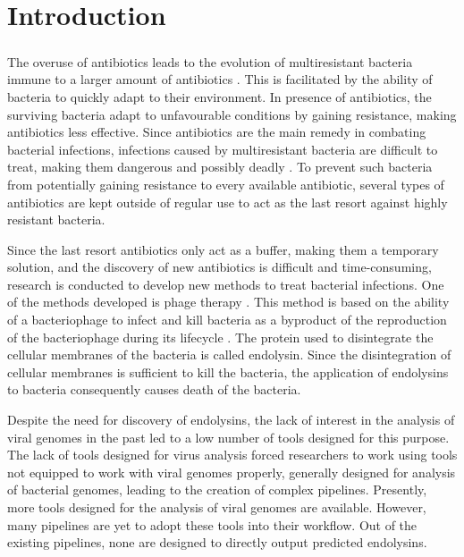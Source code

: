 \chapter*{Introduction} %

\paragraph*{}
The overuse of antibiotics leads to the evolution of multiresistant bacteria immune to a larger amount of antibiotics \cite{nikaido2009multidrug}. This is facilitated by the ability of bacteria to quickly adapt to their environment. In presence of antibiotics, the surviving bacteria adapt to unfavourable conditions by gaining resistance, making antibiotics less effective. Since antibiotics are the main remedy in combating bacterial infections, infections caused by multiresistant bacteria are difficult to treat, making them dangerous and possibly deadly \cite{mckenna2013last}. To prevent such bacteria from potentially gaining resistance to every available antibiotic, several types of antibiotics are kept outside of regular use to act as the last resort against highly resistant bacteria.

Since the last resort antibiotics only act as a buffer, making them a temporary solution, and the discovery of new antibiotics is difficult and time-consuming, research is conducted to develop new methods to treat bacterial infections. One of the methods developed is phage therapy \cite{vandenheuvel2015bacteriophage}. This method is based on the ability of a bacteriophage to infect and kill bacteria as a byproduct of the reproduction of the bacteriophage during its lifecycle \cite{gordillo2019phage}. The protein used to disintegrate the cellular membranes of the bacteria is called endolysin. Since the disintegration of cellular membranes is sufficient to kill the bacteria, the application of endolysins to bacteria consequently causes death of the bacteria. 

Despite the need for discovery of endolysins, the lack of interest in the analysis of viral genomes in the past led to a low number of tools designed for this purpose. The lack of tools designed for virus analysis forced researchers to work using tools not equipped to work with viral genomes properly, generally designed for analysis of bacterial genomes, leading to the creation of complex pipelines. Presently, more tools designed for the analysis of viral genomes are available. However, many pipelines are yet to adopt these tools into their workflow. Out of the existing pipelines, none are designed to directly output predicted endolysins.

